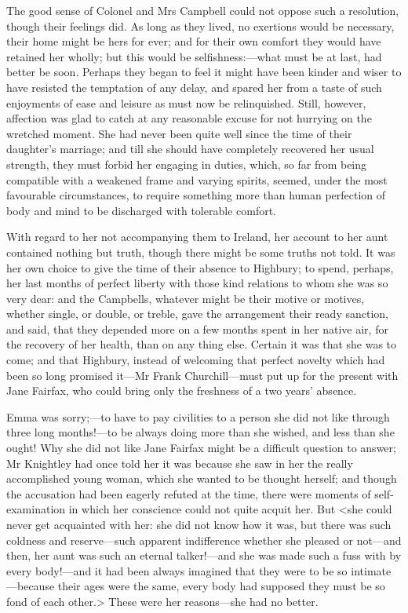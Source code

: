 The good sense of Colonel and Mrs Campbell could not oppose such a resolution, though their feelings did. As long as they lived, no exertions would be necessary, their home might be hers for ever; and for their own comfort they would have retained her wholly; but this would be selfishness:—what must be at last, had better be soon. Perhaps they began to feel it might have been kinder and wiser to have resisted the temptation of any delay, and spared her from a taste of such enjoyments of ease and leisure as must now be relinquished. Still, however, affection was glad to catch at any reasonable excuse for not hurrying on the wretched moment. She had never been quite well since the time of their daughter's marriage; and till she should have completely recovered her usual strength, they must forbid her engaging in duties, which, so far from being compatible with a weakened frame and varying spirits, seemed, under the most favourable circumstances, to require something more than human perfection of body and mind to be discharged with tolerable comfort.

With regard to her not accompanying them to Ireland, her account to her aunt contained nothing but truth, though there might be some truths not told. It was her own choice to give the time of their absence to Highbury; to spend, perhaps, her last months of perfect liberty with those kind relations to whom she was so very dear: and the Campbells, whatever might be their motive or motives, whether single, or double, or treble, gave the arrangement their ready sanction, and said, that they depended more on a few months spent in her native air, for the recovery of her health, than on any thing else. Certain it was that she was to come; and that Highbury, instead of welcoming that perfect novelty which had been so long promised it—Mr Frank Churchill—must put up for the present with Jane Fairfax, who could bring only the freshness of a two years' absence.

Emma was sorry;—to have to pay civilities to a person she did not like through three long months!—to be always doing more than she wished, and less than she ought! Why she did not like Jane Fairfax might be a difficult question to answer; Mr Knightley had once told her it was because she saw in her the really accomplished young woman, which she wanted to be thought herself; and though the accusation had been eagerly refuted at the time, there were moments of self-examination in which her conscience could not quite acquit her. But <she could never get acquainted with her: she did not know how it was, but there was such coldness and reserve—such apparent indifference whether she pleased or not—and then, her aunt was such an eternal talker!—and she was made such a fuss with by every body!—and it had been always imagined that they were to be so intimate—because their ages were the same, every body had supposed they must be so fond of each other.> These were her reasons—she had no better.

